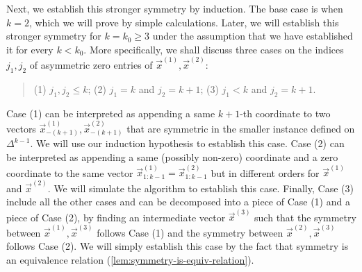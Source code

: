 Next, we establish this stronger symmetry by induction. 
The base case is when $k=2$, which we will prove by simple calculations. 
Later, we will establish this stronger symmetry for $k=k_0\geq 3$ under the assumption that we have established it for every $k<k_0$.
More specifically, we shall discuss three cases on the indices $j_1,j_2$ of asymmetric zero entries of $\vec{x}^{(1)}, \vec{x}^{(2)}$: 
\begin{quote}
(1) $j_1,j_2\leq k$; \hfill (2) $j_1=k$ and $j_2=k+1$; \hfill (3) $j_1<k$ and $j_2=k+1$. 
\end{quote}
Case (1) can be interpreted as appending a same $k+1$-th coordinate to two vectors $\vec{x}^{(1)}_{-(k+1)}, \vec{x}^{(2)}_{-(k+1)}$ that are symmetric in the smaller instance defined on $\Delta^{k-1}$.
We will use our induction hypothesis to establish this case. 
Case (2) can be interpreted as appending a same (possibly non-zero) coordinate and a zero coordinate to the same vector $\vec{x}^{(1)}_{1:k-1}=\vec{x}^{(2)}_{1:k-1}$ but in different orders for $\vec{x}^{(1)}$ and $\vec{x}^{(2)}$.
We will simulate the algorithm to establish this case.
Finally, Case (3) include all the other cases and can be decomposed into a piece of Case (1) and a piece of Case (2), by finding an intermediate vector $\vec{x}^{(3)}$ such that the symmetry between $\vec{x}^{(1)}, \vec{x}^{(3)}$ follows Case (1) and the symmetry between $\vec{x}^{(2)}, \vec{x}^{(3)}$ follows Case (2).
We will simply establish this case by the fact that symmetry is an equivalence relation (\cref{lem:symmetry-is-equiv-relation}). 

